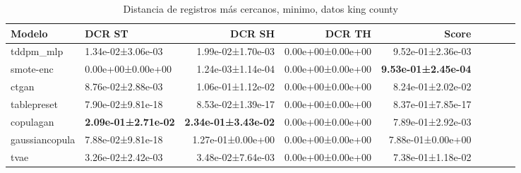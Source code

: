 \begin{table}[H]
\centering
\fontsize{10}{14}\selectfont
\caption{Distancia de registros más cercanos, minimo, datos king county}
\label{table-nndr-king county-a}
\begin{tabular}{|l|l|r|r|r|r|r|r|r|}
\hline
\rowcolor[gray]{0.8}
Modelo & DCR ST & DCR SH & DCR TH & \textbf{Score} \\
\hline tddpm\_mlp & 1.34e-02±3.06e-03 & 1.99e-02±1.70e-03 & 0.00e+00±0.00e+00 & 9.52e-01±2.36e-03 \\
\hline smote-enc & \cellcolor[rgb]{0.9, 0.54, 0.52} 0.00e+00±0.00e+00 & \cellcolor[rgb]{0.9, 0.54, 0.52} 1.24e-03±1.14e-04 & 0.00e+00±0.00e+00 & \bfseries 9.53e-01±2.45e-04 \\
\hline ctgan & 8.76e-02±2.88e-03 & 1.06e-01±1.12e-02 & 0.00e+00±0.00e+00 & 8.24e-01±2.02e-02 \\
\hline tablepreset & 7.90e-02±9.81e-18 & 8.53e-02±1.39e-17 & 0.00e+00±0.00e+00 & 8.37e-01±7.85e-17 \\
\hline copulagan & \bfseries 2.09e-01±2.71e-02 & \bfseries 2.34e-01±3.43e-02 & 0.00e+00±0.00e+00 & 7.89e-01±2.92e-03 \\
\hline gaussiancopula & 7.88e-02±9.81e-18 & 1.27e-01±0.00e+00 & 0.00e+00±0.00e+00 & 7.88e-01±0.00e+00 \\
\hline tvae & 3.26e-02±2.42e-03 & 3.48e-02±7.64e-03 & 0.00e+00±0.00e+00 & \cellcolor[rgb]{0.9, 0.54, 0.52} 7.38e-01±1.18e-02 \\
\hline
\end{tabular}
\end{table}
